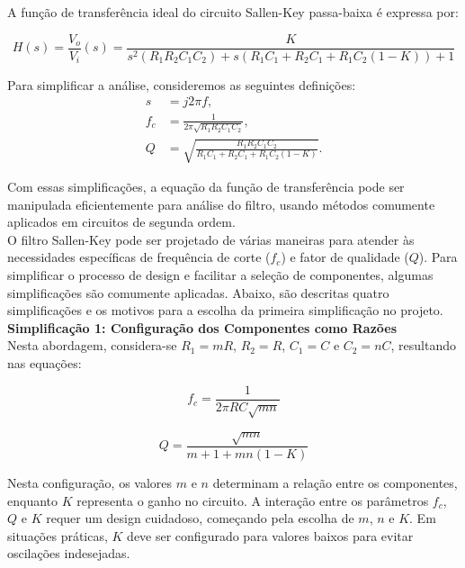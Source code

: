 \documentclass[a4paper, 12pt]{article}
\begin{document}
A função de transferência ideal do circuito Sallen-Key passa-baixa é expressa por:

\begin{equation}
H(s) = \frac{V_o}{V_i} (s) = \frac{K}{s^2 (R_1 R_2 C_1 C_2) + s \left( R_1 C_1 + R_2 C_1 + R_1 C_2 (1 - K) \right) + 1}
\end{equation}

Para simplificar a análise, consideremos as seguintes definições:
\begin{align}
s &= j2\pi f, \\
f_c &= \frac{1}{2\pi \sqrt{R_1 R_2 C_1 C_2}}, \\
Q &= \sqrt{\frac{R_1 R_2 C_1 C_2}{R_1 C_1 + R_2 C_1 + R_1 C_2 (1 - K)}}.
\end{align}

Com essas simplificações, a equação da função de transferência pode ser manipulada eficientemente para análise do filtro, usando métodos comumente aplicados em circuitos de segunda ordem.\\

O filtro Sallen-Key pode ser projetado de várias maneiras para atender às necessidades específicas de frequência de corte (\(f_c\)) e fator de qualidade (\(Q\)). Para simplificar o processo de design e facilitar a seleção de componentes, algumas simplificações são comumente aplicadas. Abaixo, são descritas quatro simplificações e os motivos para a escolha da primeira simplificação no projeto.\\

\textbf{Simplificação 1: Configuração dos Componentes como Razões}\label{ref:simp_1}\\

Nesta abordagem, considera-se \(R_1 = mR\), \(R_2 = R\), \(C_1 = C\) e \(C_2 = nC\), resultando nas equações:

\begin{equation}\label{fc_sim1}
    f_c = \frac{1}{2\pi RC\sqrt{mn}}    
\end{equation}

\begin{equation}\label{ref:fator_qualidade_fpb}
    Q = \frac{\sqrt{mn}}{m + 1 + mn(1 - K)}    
\end{equation}

Nesta configuração, os valores \(m\) e \(n\) determinam a relação entre os componentes, enquanto \(K\) representa o ganho no circuito. A interação entre os parâmetros \(f_c\), \(Q\) e \(K\) requer um design cuidadoso, começando pela escolha de \(m\), \(n\) e \(K\). Em situações práticas, \(K\) deve ser configurado para valores baixos para evitar oscilações indesejadas.\\
\end{document}
